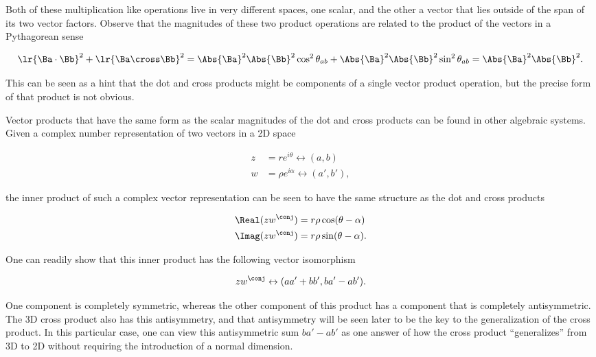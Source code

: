 Both of these multiplication like operations live in very different spaces, one scalar, and the other a vector that lies outside of the span of its two vector factors.  Observe that the magnitudes of these two product operations are related to the product of the vectors in a Pythagorean sense

\begin{dmath}\label{eqn:GAmotivation:180}
\lr{ \Ba \cdot \Bb }^2 + \lr{ \Ba \cross \Bb }^2 
=
\Abs{\Ba}^2 \Abs{\Bb}^2 \cos^2 \theta_{ab} 
+\Abs{\Ba}^2 \Abs{\Bb}^2 \sin^2 \theta_{ab} 
= 
\Abs{\Ba}^2 \Abs{\Bb}^2.
\end{dmath}

This can be seen as a hint that the dot and cross products might be components of a single vector product operation, but the precise form of that product is not obvious.

Vector products that have the same form as the scalar magnitudes of the dot and cross products can be found in other algebraic systems.  Given a complex number representation of two vectors in a 2D space

\begin{dmath}\label{eqn:GAmotivation:200}
\begin{aligned}
z &= r e^{i \theta} \leftrightarrow (a, b) \\
w &= \rho e^{i \alpha} \leftrightarrow (a', b'),
\end{aligned}
\end{dmath}

the inner product of such a complex vector representation can be seen to have the same structure as the dot and cross products

\begin{equation}\label{eqn:GAmotivation:100}
\begin{aligned}
\Real( z w^\conj ) &= r \rho \cos(\theta - \alpha) \\
\Imag( z w^\conj ) &= r \rho \sin(\theta - \alpha).
\end{aligned}
\end{equation}

One can readily show that this inner product has the following vector isomorphism

\begin{dmath}\label{eqn:GAmotivation:220}
z w^\conj \leftrightarrow ( a a' + b b', b a' - a b' ).
\end{dmath}

One component is completely symmetric, whereas the other component of this product has a component that is completely antisymmetric.  
The 3D cross product also has this antisymmetry, and that antisymmetry will be seen later to be the key to the generalization of the cross product.  In this particular case, one can view this antisymmetric sum \( b a' - a b' \) as one 
answer of how the cross product ``generalizes'' from 3D to 2D without requiring the introduction of a normal dimension.

